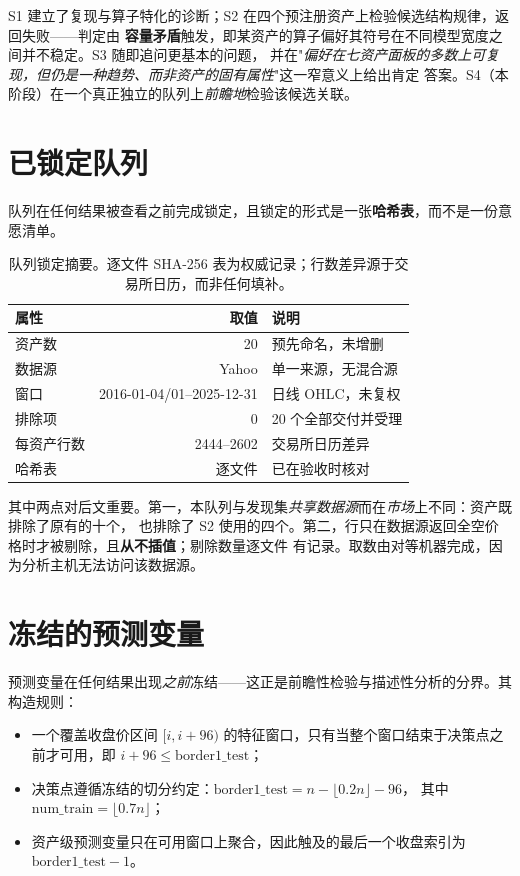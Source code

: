 \documentclass[conference]{IEEEtran}
\begin{document}
S1 建立了复现与算子特化的诊断；S2 在四个预注册资产上检验候选结构规律，返回失败——判定由
\textbf{容量矛盾}触发，即某资产的算子偏好其符号在不同模型宽度之间并不稳定。S3 随即追问更基本的问题，
并在"\emph{偏好在七资产面板的多数上可复现，但仍是一种趋势、而非资产的固有属性}"这一窄意义上给出肯定
答案。S4（本阶段）在一个真正独立的队列上\emph{前瞻地}检验该候选关联。

\section{已锁定队列}
\label{sec:cohort}

队列在任何结果被查看之前完成锁定，且锁定的形式是一张\textbf{哈希表}，而不是一份意愿清单。

\begin{table}[!t]
\centering
\small
\begin{tabular}{@{}lrl@{}}
\toprule
属性 & 取值 & 说明 \\
\midrule
资产数 & 20 & 预先命名，未增删 \\
数据源 & Yahoo & 单一来源，无混合源 \\
窗口 & 2016-01-04/01--2025-12-31 & 日线 OHLC，未复权 \\
排除项 & 0 & 20 个全部交付并受理 \\
每资产行数 & 2444--2602 & 交易所日历差异 \\
哈希表 & 逐文件 & 已在验收时核对 \\
\bottomrule
\end{tabular}
\caption{队列锁定摘要。逐文件 SHA-256 表为权威记录；行数差异源于交易所日历，而非任何填补。}
\label{tab:cohort}
\end{table}

其中两点对后文重要。第一，本队列与发现集\emph{共享数据源}而在\emph{市场}上不同：资产既排除了原有的十个，
也排除了 S2 使用的四个。第二，行只在数据源返回全空价格时才被剔除，且\textbf{从不插值}；剔除数量逐文件
有记录。取数由对等机器完成，因为分析主机无法访问该数据源。

\section{冻结的预测变量}
\label{sec:pred}

预测变量在任何结果出现\emph{之前}冻结——这正是前瞻性检验与描述性分析的分界。其构造规则：

\begin{itemize}
\item 一个覆盖收盘价区间 $[i, i+96)$ 的特征窗口，只有当整个窗口结束于决策点之前才可用，即
$i+96 \le \mathrm{border1\_test}$；
\item 决策点遵循冻结的切分约定：$\mathrm{border1\_test} = n - \lfloor 0.2n \rfloor - 96$，
其中 $\mathrm{num\_train} = \lfloor 0.7n \rfloor$；
\item 资产级预测变量只在可用窗口上聚合，因此触及的最后一个收盘索引为
$\mathrm{border1\_test} - 1$。
\end{itemize}
\end{document}
